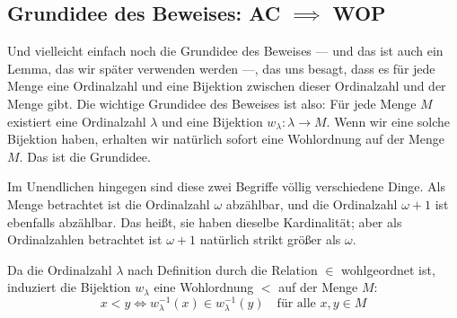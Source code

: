 \begin{math-stroke}

\end{math-stroke}

\subsection{Grundidee des Beweises: AC \texorpdfstring{$\implies$}{implies} WOP}
\begin{spoken-clean}[00:19:17 - 00:22:24]
Und vielleicht einfach noch die Grundidee des Beweises --- und das ist auch ein Lemma, das wir später verwenden werden ---, das uns besagt, dass es für jede Menge eine Ordinalzahl und eine Bijektion zwischen dieser Ordinalzahl und der Menge gibt. Die wichtige Grundidee des Beweises ist also: Für jede Menge $M$ existiert eine Ordinalzahl $\lambda$ und eine Bijektion $w_\lambda \colon \lambda \to M$. Wenn wir eine solche Bijektion haben, erhalten wir natürlich sofort eine Wohlordnung auf der Menge $M$. Das ist die Grundidee.

Im Unendlichen hingegen sind diese zwei Begriffe völlig verschiedene Dinge. Als Menge betrachtet ist die Ordinalzahl $\omega$ abzählbar, und die Ordinalzahl $\omega + 1$ ist ebenfalls abzählbar. Das heißt, sie haben dieselbe Kardinalität; aber als Ordinalzahlen betrachtet ist $\omega + 1$ natürlich strikt größer als $\omega$.
\end{spoken-clean}

\begin{math-stroke}

\begin{explanation-of-steps}
Da die Ordinalzahl $\lambda$ nach Definition durch die Relation $\in$ wohlgeordnet ist, induziert die Bijektion $w_\lambda$ eine Wohlordnung $<$ auf der Menge $M$:
\[
x < y \iff w_\lambda^{-1}(x) \in w_\lambda^{-1}(y) \quad \text{für alle } x, y \in M
\]
\end{explanation-of-steps}
\end{math-stroke}


